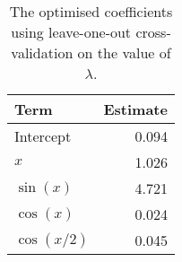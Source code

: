 \begin{table}[!h]

\caption{\label{tab:lasso-coefs}The optimised coefficients using leave-one-out cross-validation on the value of \(\lambda\).}
\centering
\begin{tabular}{lr}
\toprule
Term & Estimate\\
\midrule
Intercept & 0.094\\
\(x\) & 1.026\\
\(\sin(x)\) & 4.721\\
\(\cos(x)\) & 0.024\\
\(\cos(x/2)\) & 0.045\\
\bottomrule
\end{tabular}
\end{table}